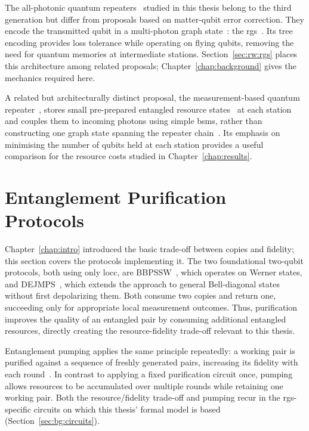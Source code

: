 The all-photonic quantum repeaters~\cite{Azuma2015All} studied in this thesis belong to the third generation but differ from proposals based on matter-qubit error correction. They encode the transmitted qubit in a multi-photon graph state~\cite{Briegel2001Persistent,Hein2006Entanglement,Hein2004Multiparty}: the \Gls{rgs}~\cite{Azuma2015All}. Its tree encoding provides loss tolerance while operating on flying qubits, removing the need for quantum memories at intermediate stations. Section~\ref{sec:rw:rgs} places this architecture among related proposals; Chapter~\ref{chap:background} gives the mechanics required here.

A related but architecturally distinct proposal, the measurement-based quantum repeater~\cite{Zwerger2012Measurementbased}, stores small pre-prepared entangled resource states~\cite{Raussendorf2002oneway,Raussendorf2002Computational,Raussendorf2003Measurementbased,Nielsen2006Clusterstate,Greenberger2009Compendium} at each station and couples them to incoming photons using simple \Glspl{bsm}, rather than constructing one graph state spanning the repeater chain~\cite{Browne2005Resourceefficient,Ewert20143,Zwerger2018Longrange}. Its emphasis on minimising the number of qubits held at each station provides a useful comparison for the resource costs studied in Chapter~\ref{chap:results}.

\section{Entanglement Purification Protocols}
\label{sec:rw:purification}

Chapter~\ref{chap:intro} introduced the basic trade-off between copies and fidelity; this section covers the protocols implementing it. The two foundational two-qubit protocols, both using only \gls{locc}, are BBPSSW~\cite{Bennett1996Purification}, which operates on Werner states, and DEJMPS~\cite{Deutsch1996Quantum}, which extends the approach to general Bell-diagonal states without first depolarizing them. Both consume two copies and return one, succeeding only for appropriate local measurement outcomes. Thus, purification improves the quality of an entangled pair by consuming additional entangled resources, directly creating the resource-fidelity trade-off relevant to this thesis.

Entanglement pumping applies the same principle repeatedly: a working pair is purified against a sequence of freshly generated pairs, increasing its fidelity with each round~\cite{Dur1999Quantum,Deutsch1996Quantum,Bennett1996Purification}. In contrast to applying a fixed purification circuit once, pumping allows resources to be accumulated over multiple rounds while retaining one working pair. Both the resource/fidelity trade-off and pumping recur in the \Gls{rgs}-specific circuits on which this thesis' formal model is based (Section~\ref{sec:bg:circuits}).


